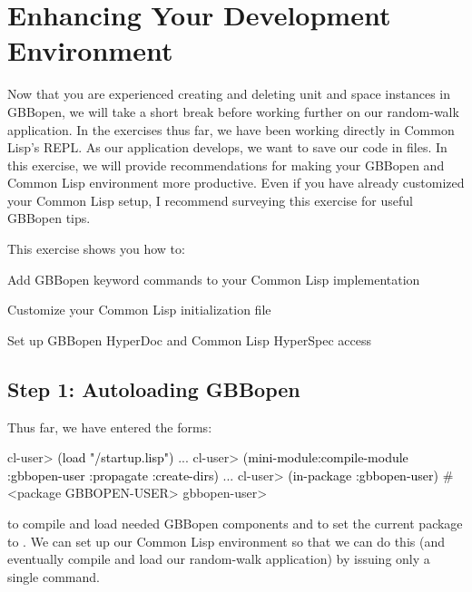 \documentclass[10pt,twoside,english,pdftex]{article}
\begin{document}
\section{Enhancing Your Development Environment}
\label{sec:environment}%

Now that you are experienced creating and deleting unit and space instances in
GBBopen, we will take a short break before working further on our random-walk
application.  In the exercises thus far, we have been working directly in
Common Lisp's REPL.  As our application develops, we want to save our code in
files. In this exercise, we will provide recommendations for making your
GBBopen and Common Lisp environment more productive.  Even if you have already
customized your Common Lisp setup, I recommend surveying this exercise for
useful GBBopen tips.

\fndocrule

This exercise shows you how to:
\begin{tightitemize}
\item Add GBBopen keyword commands to your Common Lisp implementation
\item Customize your Common Lisp initialization file
\item Set up GBBopen HyperDoc and Common Lisp HyperSpec access
\end{tightitemize}

\fndocrule

\subsection*{Step 1: Autoloading GBBopen}

Thus far, we have entered the forms:
%
\W\supp
\begin{example}
\textcolor{darkergray}{%
  cl-user> \textcolor{black}{(load "/startup.lisp")}
     ...
  cl-user> \textcolor{black}{(mini-module:compile-module :gbbopen-user :propagate :create-dirs)}
     ...
  cl-user> \textcolor{black}{(in-package :gbbopen-user)}
  #<package GBBOPEN-USER>
  gbbopen-user>}
\end{example}
%
to compile and load needed GBBopen components and to set the current package
to .  We can set up our Common Lisp environment so that we
can do this (and eventually compile and load our random-walk application) by
issuing only a single command.
\end{document}
